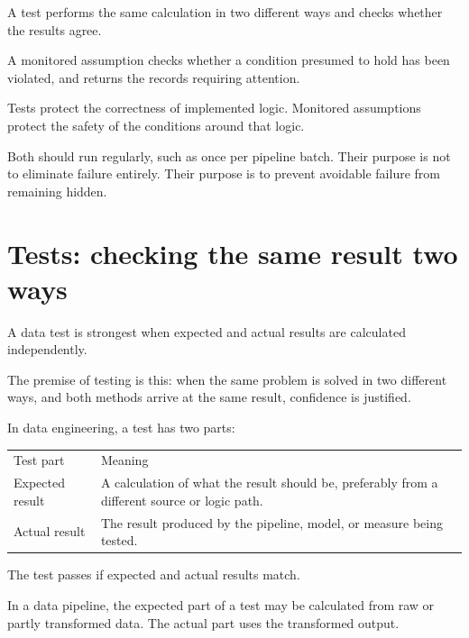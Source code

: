 \documentclass[10pt,openany,10pt]{book}
\newcounter{none}
\let\podeToprule\toprule
\let\podeMidrule\midrule
\let\podeBottomrule\bottomrule
\renewcommand{\toprule}{\arrayrulecolor{pbiGrid}\podeToprule}
\renewcommand{\midrule}{\arrayrulecolor{pbiGrid}\podeMidrule}
\renewcommand{\bottomrule}{\arrayrulecolor{pbiGrid}\podeBottomrule}
\begin{document}
A test performs the same calculation in two different ways and checks
whether the results agree.

A monitored assumption checks whether a condition presumed to hold has
been violated, and returns the records requiring attention.

Tests protect the correctness of implemented logic. Monitored
assumptions protect the safety of the conditions around that logic.

Both should run regularly, such as once per pipeline batch. Their
purpose is not to eliminate failure entirely. Their purpose is to
prevent avoidable failure from remaining hidden.

\section{Tests: checking the same result two
ways}\label{tests-checking-the-same-result-two-ways}

A data test is strongest when expected and actual results are calculated
independently.

The premise of testing is this: when the same problem is solved in two
different ways, and both methods arrive at the same result, confidence
is justified.

In data engineering, a test has two parts:

{\def\LTcaptype{none} %
\begin{longtable}[]{@{}
  >{\raggedright\arraybackslash}p{}
  >{\raggedright\arraybackslash}p{}@{}}
\toprule\noalign{}
\begin{minipage}[b]{\linewidth}\raggedright
Test part
\end{minipage} & \begin{minipage}[b]{\linewidth}\raggedright
Meaning
\end{minipage} \\
\midrule\noalign{}
\endhead
\bottomrule\noalign{}
\endlastfoot
Expected result & A calculation of what the result should be, preferably
from a different source or logic path. \\
Actual result & The result produced by the pipeline, model, or measure
being tested. \\
\end{longtable}
}

The test passes if expected and actual results match.

In a data pipeline, the expected part of a test may be calculated from
raw or partly transformed data. The actual part uses the transformed
output.
\end{document}
